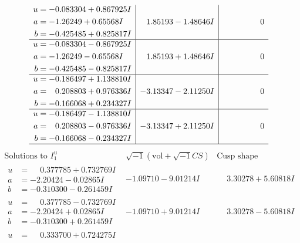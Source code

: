 \documentclass[1p]{elsarticle_modified}
\theoremstyle{definition}
\newcommand{\I}{\sqrt{-1}}
\begin{document}
$$\begin{array}{c|c|c}
\begin{aligned}
u &= -0.083304 + 0.867925 I \\
a &= -1.26249 + 0.65568 I \\
b &= -0.425485 + 0.825817 I\end{aligned}
 & \phantom{-}1.85193 - 1.48646 I & \phantom{-0.000000 } 0 \\ \hline\begin{aligned}
u &= -0.083304 - 0.867925 I \\
a &= -1.26249 - 0.65568 I \\
b &= -0.425485 - 0.825817 I\end{aligned}
 & \phantom{-}1.85193 + 1.48646 I & \phantom{-0.000000 } 0 \\ \hline\begin{aligned}
u &= -0.186497 + 1.138810 I \\
a &= \phantom{-}0.208803 + 0.976336 I \\
b &= -0.166068 + 0.234327 I\end{aligned}
 & -3.13347 - 2.11250 I & \phantom{-0.000000 } 0 \\ \hline\begin{aligned}
u &= -0.186497 - 1.138810 I \\
a &= \phantom{-}0.208803 - 0.976336 I \\
b &= -0.166068 - 0.234327 I\end{aligned}
 & -3.13347 + 2.11250 I & \phantom{-0.000000 } 0\\
 \hline 
 \end{array}$$\newpage$$\begin{array}{c|c|c}  
\text{Solutions to }I^u_{1}& \I (\text{vol} + \sqrt{-1}CS) & \text{Cusp shape}\\
 \hline 
\begin{aligned}
u &= \phantom{-}0.377785 + 0.732769 I \\
a &= -2.20424 - 0.02865 I \\
b &= -0.310300 - 0.261459 I\end{aligned}
 & -1.09710 - 9.01214 I & \phantom{-}3.30278 + 5.60818 I \\ \hline\begin{aligned}
u &= \phantom{-}0.377785 - 0.732769 I \\
a &= -2.20424 + 0.02865 I \\
b &= -0.310300 + 0.261459 I\end{aligned}
 & -1.09710 + 9.01214 I & \phantom{-}3.30278 - 5.60818 I \\ \hline\begin{aligned}
u &= \phantom{-}0.333700 + 0.724275 I \\

\end{aligned}
\end{array}$$
\end{document}
